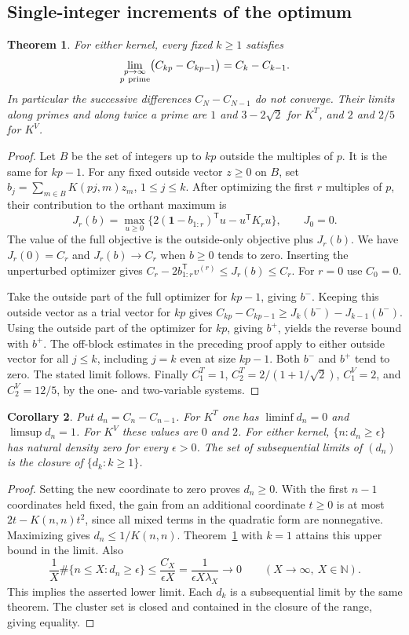 \documentclass[11pt,a4paper]{article}
\newtheorem{theorem}{Theorem}[section]
\newtheorem{corollary}[theorem]{Corollary}
\begin{document}
\subsection{Single-integer increments of the optimum}
\begin{theorem}\label{thm:gal-jumps}
For either kernel, every fixed $k\ge1$ satisfies
\[
 \lim_{\substack{p\to\infty\\p\ {\rm prime}}}
   \bigl(C_{kp}-C_{kp-1}\bigr)=C_k-C_{k-1}.
\]
In particular the successive differences $C_N-C_{N-1}$ do not converge. Their limits along primes and along twice a prime are $1$ and $3-2\sqrt2$ for $K^T$, and $2$ and $2/5$ for $K^V$.
\end{theorem}
\begin{proof}
Let $B$ be the set of integers up to $kp$ outside the multiples of $p$. It is the same for $kp-1$. For any fixed outside vector $z\ge0$ on $B$, set $b_j=\sum_{m\in B}K(pj,m)z_m$, $1\le j\le k$. After optimizing the first $r$ multiples of $p$, their contribution to the orthant maximum is
\[
 J_r(b)=\max_{u\ge0}\{2(\boldsymbol1-b_{1:r})^{\mathsf T}u-u^{\mathsf T}K_ru\},
 \qquad J_0=0 .
\]
The value of the full objective is the outside-only objective plus $J_r(b)$. We have $J_r(0)=C_r$ and $J_r(b)\to C_r$ when $b\ge0$ tends to zero. Inserting the unperturbed optimizer gives $C_r-2b_{1:r}^{\mathsf T}v^{(r)}\le J_r(b)\le C_r$. For $r=0$ use $C_0=0$.

Take the outside part of the full optimizer for $kp-1$, giving $b^-$. Keeping this outside vector as a trial vector for $kp$ gives $C_{kp}-C_{kp-1}\ge J_k(b^-)-J_{k-1}(b^-)$. Using the outside part of the optimizer for $kp$, giving $b^+$, yields the reverse bound with $b^+$. The off-block estimates in the preceding proof apply to either outside vector for all $j\le k$, including $j=k$ even at size $kp-1$. Both $b^-$ and $b^+$ tend to zero. The stated limit follows. Finally $C_1^T=1$, $C_2^T=2/(1+1/\sqrt2)$, $C_1^V=2$, and $C_2^V=12/5$, by the one- and two-variable systems.
\end{proof}


\begin{corollary}\label{cor:gal-jump-limits}
Put $d_n=C_n-C_{n-1}$. For $K^T$ one has $\liminf d_n=0$ and $\limsup d_n=1$. For $K^V$ these values are $0$ and $2$. For either kernel, $\{n:d_n\ge\epsilon\}$ has natural density zero for every $\epsilon>0$. The set of subsequential limits of $(d_n)$ is the closure of $\{d_k:k\ge1\}$.
\end{corollary}
\begin{proof}
Setting the new coordinate to zero proves $d_n\ge0$. With the first $n-1$ coordinates held fixed, the gain from an additional coordinate $t\ge0$ is at most $2t-K(n,n)t^2$, since all mixed terms in the quadratic form are nonnegative. Maximizing gives $d_n\le1/K(n,n)$. Theorem~\ref{thm:gal-jumps} with $k=1$ attains this upper bound in the limit. Also
\[
 \frac1X\#\{n\le X:d_n\ge\epsilon\}
 \le\frac{C_X}{\epsilon X}=\frac1{\epsilon X\lambda_X}\longrightarrow0
 \qquad(X\to\infty,\ X\in\mathbb N).
\]
This implies the asserted lower limit. Each $d_k$ is a subsequential limit by the same theorem. The cluster set is closed and contained in the closure of the range, giving equality.
\end{proof}
\end{document}

